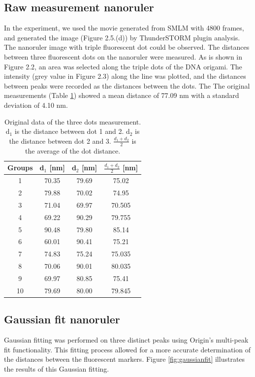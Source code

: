 \documentclass[a4paper,english,12pt,bibliography=totoc]{scrreprt}
\begin{document}
\subsection{Raw measurement nanoruler}
In the experiment, we used the movie generated from SMLM with 4800 frames, and generated the image (Figure 2.5.(d)) by ThunderSTORM plugin analysis. The nanoruler image with triple fluorescent dot could be observed. The distances between three fluorescent dots on the nanoruler were measured. As is shown in Figure 2.2, an area was selected along the triple dots of the DNA origami. The intensity (grey value in Figure 2.3) along the line was plotted, and the distances between peaks were recorded as the distances between the dots. The  The original measurements (Table \ref{tab:original_data}) showed a mean distance of 77.09 nm with a standard deviation of 4.10 nm. 

\begin{table}[H]
    \centering
    \begin{tabular}{c|c|c|c}
    \hline
    Groups    & d$_1$ [nm] & d$_2$ [nm] & $\frac{d_1 +d_2}{2}$ [nm] \\
    \hline
     1    &  70.35&79.69 & 75.02\\
     2    &  79.88&70.02 &74.95  \\
     3    &  71.04&69.97&70.505\\
     4    &  69.22&90.29& 79.755\\
     5    &  90.48&79.80&85.14\\
     6    &  60.01&90.41 &75.21\\
     7    &  74.83&75.24 & 75.035\\
     8    &  70.06&90.01 & 80.035\\
     9    &  69.97&80.85&75.41\\
     10    & 79.69&80.00 & 79.845\\
    \hline
    \end{tabular}
    \caption{Original data of the three dots measurement. d$_1$ is the distance between dot 1 and 2. d$_2$ is the distance between dot 2 and 3. $\frac{d_1 +d_2}{2}$ is the average of the dot distance.}
    \label{tab:original_data}
\end{table}
\subsection{Gaussian fit nanoruler}
Gaussian fitting was performed on three distinct peaks using Origin's multi-peak fit functionality. This fitting process allowed for a more accurate determination of the distances between the fluorescent markers. Figure \ref{fig:gaussianfit} illustrates the results of this Gaussian fitting.
\end{document}
